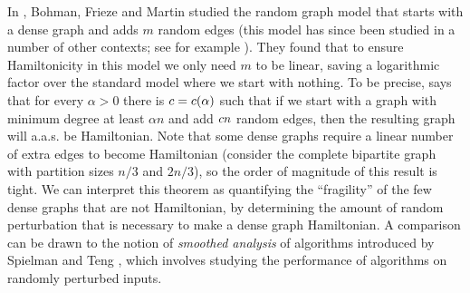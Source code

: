 \documentclass[11pt,english]{article}
\theoremstyle{plain}
\theoremstyle{definition}
\theoremstyle{definition}
\theoremstyle{plain}
\theoremstyle{plain}
\theoremstyle{plain}
\theoremstyle{plain}
\theoremstyle{remark}
\theoremstyle{remark}
\let\originalleft\left
\let\originalright\right
\renewcommand{\left}{\mathopen{}\mathclose\bgroup\originalleft}
\renewcommand{\right}{\aftergroup\egroup\originalright}
\begin{document}
In \cite{BFM03}, Bohman, Frieze and Martin studied the random graph model that
starts with a dense graph and adds $m$ random edges (this model has
since been studied in a number of other contexts; see for example
\cite{BHM04,KST06}). They found that to ensure Hamiltonicity in this
model we only need $m$ to be linear, saving a logarithmic factor
over the standard model where we start with nothing. To be precise,
\cite[Theorem~1]{BFM03} says that for every $\alpha>0$ there is
$\cdi=\cdi\left(\alpha\right)$ such that if we start with a graph with
minimum degree at least $\alpha n$ and add $c n$
random edges, then the resulting graph will a.a.s.{} be Hamiltonian.
Note that some dense graphs require a linear number of extra edges
to become Hamiltonian (consider the complete bipartite graph with
partition sizes $n/3$ and $2n/3$), so the order of magnitude of this result is tight. 
We can interpret this theorem as quantifying the ``fragility''
of the few dense graphs that are not Hamiltonian, by determining the
amount of random perturbation that is necessary to make a dense graph
Hamiltonian. A comparison can be drawn to the notion of \emph{smoothed
analysis} of algorithms introduced by Spielman and Teng \cite{ST04}, which involves
studying the performance of algorithms on randomly perturbed inputs.
\end{document}

